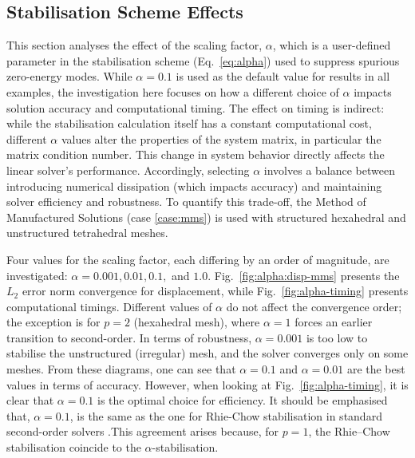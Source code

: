 \documentclass[sn-mathphys,Numbered]{sn-jnl}%
\begin{document}
\subsection{Stabilisation Scheme Effects}
%
This section analyses the effect of the scaling factor, $\alpha$, which is a user-defined parameter in the stabilisation scheme (Eq.~\eqref{eq:alpha}) used to suppress spurious zero-energy modes. While $\alpha=0.1$ is used as the default value for results in all examples, the investigation here focuses on how a different choice of $\alpha$ impacts solution accuracy and computational timing.
The effect on timing is indirect: while the stabilisation calculation itself has a constant computational cost, different $\alpha$ values alter the properties of the system matrix, in particular the matrix condition number. 
This change in system behavior directly affects the linear solver's performance. 
Accordingly, selecting $\alpha$ involves a balance between introducing numerical dissipation (which impacts accuracy) and maintaining solver efficiency and robustness. 
To quantify this trade-off, the Method of Manufactured Solutions (case \ref{case:mms}) is used with structured hexahedral and unstructured tetrahedral meshes.

Four values for the scaling factor, 
each differing by an order of magnitude, are investigated: $\alpha = 0.001, 0.01, 0.1,$ and $1.0$. 
Fig.~\ref{fig:alpha:disp-mms} presents the $L_2$ error norm convergence for displacement, while Fig.~\ref{fig:alpha-timing} presents computational timings. 
Different values of $\alpha$ do not affect the convergence order; the exception is for $p=2$ (hexahedral mesh), where $\alpha=1$ forces an earlier transition to second-order. 
In terms of robustness, $\alpha=0.001$ is too low to stabilise the unstructured (irregular) mesh, and the solver converges only on some meshes. 
From these diagrams, one can see that $\alpha=0.1$ and $\alpha=0.01$ are the best values in terms of accuracy. However, when looking at Fig.~\ref{fig:alpha-timing}, 
it is clear that $\alpha=0.1$ is the optimal choice for efficiency. 
It should be emphasised that, $\alpha=0.1$, is the same as the one for Rhie-Chow stabilisation in standard second-order solvers \cite{Cardiff2025}.This agreement arises because, for $p=1$, the Rhie–Chow stabilisation coincide to the $\alpha$-stabilisation.
\end{document}
